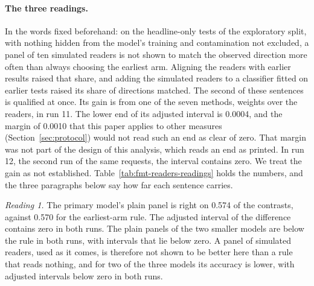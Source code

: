\paragraph{The three readings.} In the words fixed beforehand: on the headline-only tests of the exploratory split, with nothing hidden from the model's training and contamination not excluded, a panel of ten simulated readers is not shown to match the observed direction more often than always choosing the earliest arm. Aligning the readers with earlier results raised that share, and adding the simulated readers to a classifier fitted on earlier tests raised its share of directions matched. The second of these sentences is qualified at once. Its gain is from one of the seven methods, weights over the readers, in run 11. The lower end of its adjusted interval is 0.0004, and the margin of 0.0010 that this paper applies to other measures (Section~\ref{sec:protocol}) would not read such an end as clear of zero. That margin was not part of the design of this analysis, which reads an end as printed. In run 12, the second run of the same requests, the interval contains zero. We treat the gain as not established. Table~\ref{tab:fmt-readers-readings} holds the numbers, and the three paragraphs below say how far each sentence carries.

\emph{Reading 1.} The primary model's plain panel is right on 0.574 of the contrasts, against 0.570 for the earliest-arm rule. The adjusted interval of the difference contains zero in both runs. The plain panels of the two smaller models are below the rule in both runs, with intervals that lie below zero. A panel of simulated readers, used as it comes, is therefore not shown to be better here than a rule that reads nothing, and for two of the three models its accuracy is lower, with adjusted intervals below zero in both runs.

